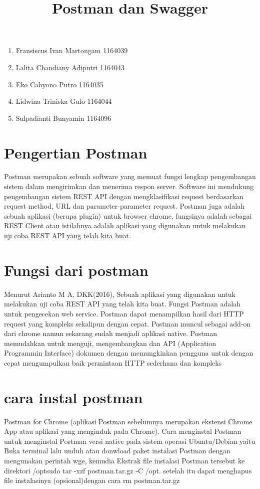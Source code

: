 \documentclass[12pt,a4paper]{article}
\begin{document}
\title{Postman dan Swagger}
\maketitle
\begin{enumerate}
\item Fransiscus Ivan Martongam      1164039 \\
\item Lalita Chandiany Adiputri      1164043\\
\item Eko Cahyono Putro              1164035\\
\item Lidwina Triniska Gulo          1164044\\
\item Sulpadianti Bunyamin           1164096\\
\end{enumerate}

\section{Pengertian Postman}
Postman merupakan sebuah software yang memuat fungsi lengkap pengembangan sistem dalam mengirimkan dan menerima respon server. Software ini mendukung pengembangan sistem REST API dengan mengklasifikasi request berdasarkan request method, URL dan parameter-parameter request. Postman juga adalah sebuah aplikasi (berupa plugin) untuk browser chrome, fungsinya adalah sebagai REST Client atau istilahnya adalah aplikasi yang digunakan untuk melakukan uji coba REST API yang telah kita buat.

\section{Fungsi dari postman}
Menurut Arianto M A, DKK(2016), Sebuah aplikasi yang digunakan untuk melakukan uji coba REST API yang telah kita buat. Fungsi Postman adalah untuk pengecekan web service. Postman dapat menampilkan hasil dari HTTP request yang kompleks sekalipun dengan cepat. Postman muncul sebagai add-on dari chrome namun sekarang sudah menjadi aplikasi native. Postman memudahkan untuk menguji, mengembangkan dan API (Application Programmin Interface) dokumen dengan memungkinkan pengguna untuk dengan cepat mengumpulkan baik permintaan HTTP sederhana dan kompleks

\section{cara instal postman}
Postman for Chrome (aplikasi Postman sebelumnya merupakan ekstensi Chrome App atau aplikasi yang menginduk pada Chrome).
Cara menginstal Postman untuk menginstal Postman versi native pada sistem operasi Ubuntu/Debian yaitu 
Buka terminal lalu unduh atau donwload paket instalasi Postman dengan mengunakan perintah wge,
kemudia Ekstrak file instalasi Postman tersebut ke direktori /optsudo tar -xzf postman.tar.gz -C /opt.
setelah itu dapat menghapus file instalasinya (opsional)dengan cara rm postman.tar.gz
\end{document}
